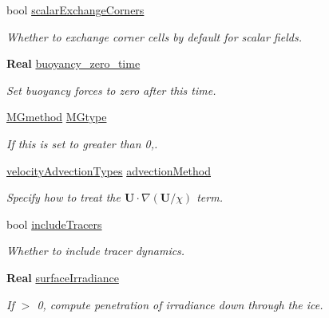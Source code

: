 \begin{DoxyCompactItemize}
\mbox{\label{struct_mushy_layer_options_abcd93960db395819aa2acae1424eb5eb}} 
bool \hyperlink{struct_mushy_layer_options_abcd93960db395819aa2acae1424eb5eb}{scalar\+Exchange\+Corners}
\begin{DoxyCompactList}\small\item\em Whether to exchange corner cells by default for scalar fields. \end{DoxyCompactList}\item 
\mbox{\label{struct_mushy_layer_options_a39103919241a7c522a33a8828c914f7e}} 
\textbf{ Real} \hyperlink{struct_mushy_layer_options_a39103919241a7c522a33a8828c914f7e}{buoyancy\+\_\+zero\+\_\+time}
\begin{DoxyCompactList}\small\item\em Set buoyancy forces to zero after this time. \end{DoxyCompactList}\item 
\hyperlink{mushy_layer_opt_8h_a1f6390801f119adac644ec2f1b17079c}{M\+Gmethod} \hyperlink{struct_mushy_layer_options_a95b4866ff6bd6d9ba166a65cf0451873}{M\+Gtype}
\begin{DoxyCompactList}\small\item\em If this is set to greater than 0,. \end{DoxyCompactList}\item 
\mbox{\label{struct_mushy_layer_options_aa4b570d63e22c480f19c9d280f579120}} 
\hyperlink{mushy_layer_opt_8h_a42c926e6b1363d4c5b151bbac3494fc6}{velocity\+Advection\+Types} \hyperlink{struct_mushy_layer_options_aa4b570d63e22c480f19c9d280f579120}{advection\+Method}
\begin{DoxyCompactList}\small\item\em Specify how to treat the $ \mathbf{U} \cdot \nabla \left( \mathbf{U}/\chi \right) $ term. \end{DoxyCompactList}\item 
\mbox{\label{struct_mushy_layer_options_a7447ad03fa4ad121ed5ef6c8cab586dd}} 
bool \hyperlink{struct_mushy_layer_options_a7447ad03fa4ad121ed5ef6c8cab586dd}{include\+Tracers}
\begin{DoxyCompactList}\small\item\em Whether to include tracer dynamics. \end{DoxyCompactList}\item 
\mbox{\label{struct_mushy_layer_options_a965af99babf9a15bc4762b26256354e9}} 
\textbf{ Real} \hyperlink{struct_mushy_layer_options_a965af99babf9a15bc4762b26256354e9}{surface\+Irradiance}
\begin{DoxyCompactList}\small\item\em If $>$ 0, compute penetration of irradiance down through the ice. \end{DoxyCompactList}\end{DoxyCompactItemize}


